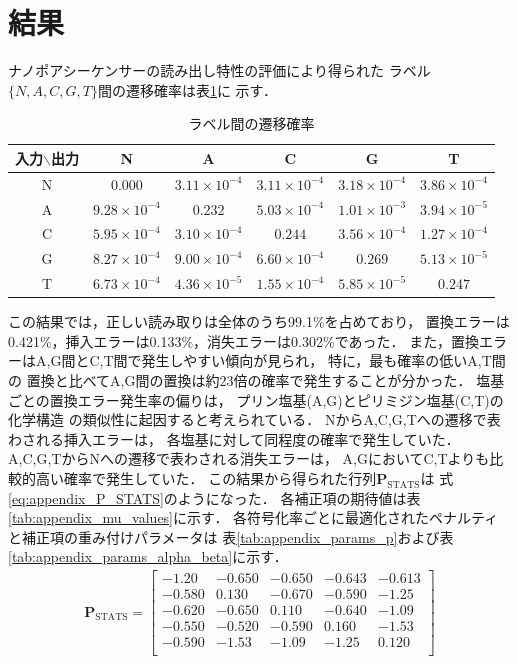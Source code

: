 \documentclass[sotsuron]{kuee}
\begin{document}
\section{結果}
ナノポアシーケンサーの読み出し特性の評価により得られた
ラベル$\{N,A,C,G,T\}$間の遷移確率は表\ref{tab:transition_matrix}に
示す．
\begin{table}
  \centering
  \caption{ラベル間の遷移確率}
  \label{tab:transition_matrix}
  \begin{tabular}{c|ccccc}
    \hline
    入力$\backslash$出力 & N & A & C & G & T \\
    \hline
    N & $0.000$ & $3.11 \times 10^{-4}$ & $3.11 \times 10^{-4}$ & $3.18 \times 10^{-4}$ & $3.86 \times 10^{-4}$  \\
    A & $9.28 \times 10^{-4}$ & $0.232$ & $5.03 \times 10^{-4}$ & $1.01 \times 10^{-3}$ & $3.94 \times 10^{-5}$ \\
    C & $5.95 \times 10^{-4}$ & $3.10 \times 10^{-4}$ & $0.244$ & $3.56 \times 10^{-4}$ & $1.27 \times 10^{-4}$ \\
    G & $8.27 \times 10^{-4}$ & $9.00 \times 10^{-4}$ & $6.60 \times 10^{-4}$ & $0.269$ & $5.13 \times 10^{-5}$ \\
    T & $6.73 \times 10^{-4}$ & $4.36 \times 10^{-5}$ & $1.55 \times 10^{-4}$ & $5.85 \times 10^{-5}$ & $0.247$ \\
    \hline
  \end{tabular}
\end{table}
この結果では，正しい読み取りは全体のうち99.1\%を占めており，
置換エラーは0.421\%，挿入エラーは0.133\%，消失エラーは0.302\%であった．
また，置換エラーはA,G間とC,T間で発生しやすい傾向が見られ，
特に，最も確率の低いA,T間の
置換と比べてA,G間の置換は約23倍の確率で発生することが分かった．
塩基ごとの置換エラー発生率の偏りは，
プリン塩基(A,G)とピリミジン塩基(C,T)の化学構造
の類似性に起因すると考えられている\cite{10.1371/journal.pone.0257521}．
NからA,C,G,Tへの遷移で表わされる挿入エラーは，
各塩基に対して同程度の確率で発生していた．
A,C,G,TからNへの遷移で表わされる消失エラーは，
A,GにおいてC,Tよりも比較的高い確率で発生していた．
この結果から得られた行列$\bm{P}_{\mathrm{STATS}}$は
式\eqref{eq:appendix_P_STATS}のようになった．
各補正項の期待値は表\ref{tab:appendix_mu_values}に示す．
各符号化率ごとに最適化されたペナルティと補正項の重み付けパラメータは
表\ref{tab:appendix_params_p}および表\ref{tab:appendix_params_alpha_beta}に示す．
\begin{align}
  \bm{P}_{\mathrm{STATS}} =
  \begin{bmatrix}
    -1.20 & -0.650 & -0.650 & -0.643 & -0.613 \\
    -0.580 & 0.130 & -0.670 & -0.590 & -1.25 \\
    -0.620 & -0.650 & 0.110 & -0.640 & -1.09 \\
    -0.550 & -0.520 & -0.590 & 0.160 & -1.53 \\
    -0.590 & -1.53 & -1.09 & -1.25 & 0.120 \\
  \end{bmatrix} \label{eq:appendix_P_STATS}
\end{align}
\end{document}
